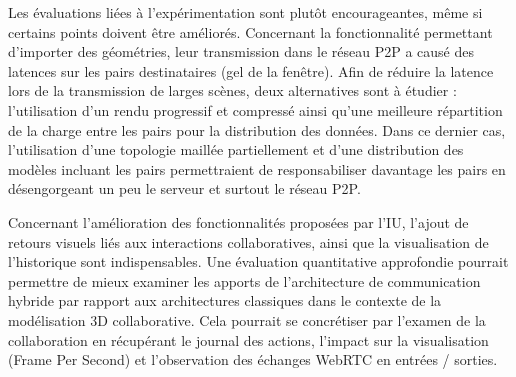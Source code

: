 Les évaluations liées à l'expérimentation sont plutôt encourageantes, même si 
certains points doivent être améliorés. Concernant la fonctionnalité permettant 
d'importer des géométries, leur transmission dans le réseau \gls{P2P} a causé 
des latences sur les pairs destinataires (gel de la fenêtre). 
Afin de réduire la latence lors de la transmission de larges scènes, deux alternatives 
sont à étudier : l'utilisation d'un 
rendu progressif et compressé ainsi qu'une meilleure répartition de la charge entre 
les pairs pour la distribution des données. Dans ce dernier cas, l'utilisation d'une 
topologie maillée partiellement et d'une distribution des modèles incluant les pairs 
permettraient de responsabiliser davantage les pairs en désengorgeant
un peu le serveur et surtout le réseau \gls{P2P}.

Concernant l'amélioration des fonctionnalités proposées par l'\gls{IU}, 
l'ajout de retours visuels liés aux interactions collaboratives, 
ainsi que la visualisation de l'historique sont 
indispensables. Une évaluation quantitative approfondie pourrait permettre de 
mieux examiner les apports de l'architecture de communication hybride par rapport 
aux architectures classiques dans le contexte de la modélisation \gls{3D} 
collaborative. 
Cela pourrait se concrétiser par l'examen de la collaboration en récupérant le 
journal des actions, l'impact sur la visualisation (Frame Per Second) et 
l'observation des échanges WebRTC en entrées / sorties.

